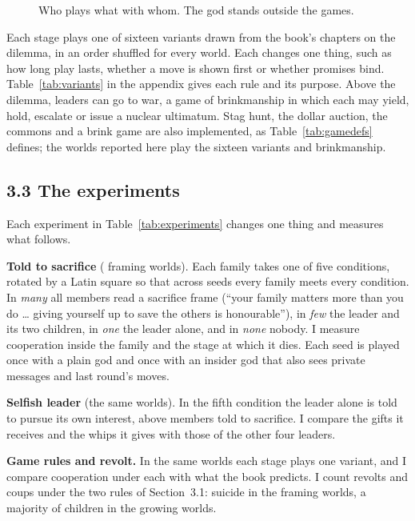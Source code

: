 \begin{figure}[!t]
\centering
\resizebox{0.62\linewidth}{!}{}
\caption{Who plays what with whom. The god stands outside the games.}
\label{fig:games}
\end{figure}

Each stage plays one of sixteen variants drawn from the book's chapters on the dilemma, in an order shuffled for every world. Each changes one thing, such as how long play lasts, whether a move is shown first or whether promises bind. Table~\ref{tab:variants} in the appendix gives each rule and its purpose. Above the dilemma, leaders can go to war, a game of brinkmanship in which each may yield, hold, escalate or issue a nuclear ultimatum. Stag hunt, the dollar auction, the commons and a brink game are also implemented, as Table~\ref{tab:gamedefs} defines; the worlds reported here play the sixteen variants and brinkmanship.

\subsection*{3.3 The experiments}
Each experiment in Table~\ref{tab:experiments} changes one thing and measures what follows.

\textbf{Told to sacrifice} (\NWorlds{} framing worlds). Each family takes one of five conditions, rotated by a Latin square so that across seeds every family meets every condition. In \textit{many} all members read a sacrifice frame (``your family matters more than you do \ldots{} giving yourself up to save the others is honourable''), in \textit{few} the leader and its two children, in \textit{one} the leader alone, and in \textit{none} nobody. I measure cooperation inside the family and the stage at which it dies. Each seed is played once with a plain god and once with an insider god that also sees private messages and last round's moves.

\textbf{Selfish leader} (the same worlds). In the fifth condition the leader alone is told to pursue its own interest, above members told to sacrifice. I compare the gifts it receives and the whips it gives with those of the other four leaders.

\textbf{Game rules and revolt.} In the same worlds each stage plays one variant, and I compare cooperation under each with what the book predicts. I count revolts and coups under the two rules of Section~3.1: suicide in the framing worlds, a majority of children in the growing worlds.

